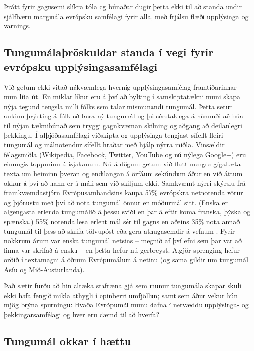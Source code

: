 \begin{multicols}{2}
Þrátt fyrir gagnsemi slíkra tóla og búnaðar dugir þetta ekki til að standa undir sjálfbæru margmála evrópsku samfélagi fyrir alla, með frjálsu flæði upplýsinga og varnings.

\subsection{Tungumálaþröskuldar standa í vegi fyrir evrópsku upplýsinga\-samfélagi}
  
Við getum ekki vitað nákvæmlega hvernig upplýsingasamfélag framtíðarinnar mun líta út. En miklar líkur eru á því að bylting í samskiptatækni muni skapa nýja tegund tengsla milli fólks sem talar mismunandi tungumál. Þetta setur aukinn þrýsting á fólk að læra ný tungumál og þó sérstaklega á hönnuði að búa til nýjan tæknibúnað sem tryggi gagnkvæman skilning og aðgang að deilanlegri þekkingu. Í alþjóðasamfélagi viðskipta og upplýsinga tengjast sífellt fleiri tungumál og málnotendur sífellt hraðar með hjálp nýrra miðla. Vinsældir félagsmiðla (Wikipedia, Facebook, Twitter, YouTube og nú nýlega Google+) eru einungis toppurinn á ísjakanum.
Nú á dögum getum við flutt margra gígabæta texta um heiminn þveran og endilangan á örfáum sekúndum áður en við áttum okkur á því að hann er á máli sem við skiljum ekki. Samkvæmt nýrri skýrslu frá framkvæmdastjórn Evrópusambandsins kaupa 57\% evrópskra netnotenda vörur og þjónustu með því að nota tungumál önnur en móðurmál sitt. (Enska er algengasta erlenda tungumálið á þessu sviði en þar á eftir koma franska, þýska og spænska.) 55\% notenda lesa erlent mál sér til gagns en aðeins 35\% nota annað tungumál til þess að skrifa tölvupóst eða gera athugasemdir á vefnum \cite{EC1}. Fyrir nokkrum árum var enska tungumál netsins -- megnið af því efni sem þar var að finna var skrifað á ensku -- en þetta hefur nú gerbreyst. Algjör sprenging hefur orðið í textamagni á öðrum Evrópumálum á netinu (og sama gildir um tungumál Asíu og Mið-Austurlanda). 

Það sætir furðu að hin altæka stafræna gjá sem munur tungumála skapar skuli ekki hafa fengið mikla athygli í opinberri umfjöllun; samt sem áður vekur hún mjög brýna spurningu: Hvaða Evrópumál munu dafna í netvæddu upplýsinga- og þekkingarsamfélagi og hver eru dæmd til að hverfa?

\subsection{Tungumál okkar í hættu}


\end{multicols}
